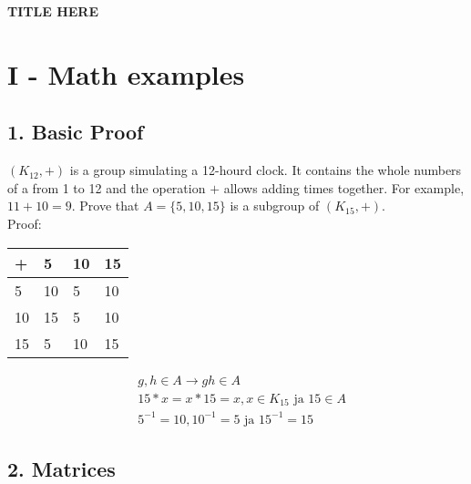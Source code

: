 \documentclass[12pt, oneside]{article}
\begin{document}
\pagestyle{fancy}
\rhead{ \thepage}


\begin{center}
\textbf{\Large TITLE HERE}
\end{center}

\section*{I - Math examples}

\subsection*{1. Basic Proof} 

$(K_{12}, +)$ is a group simulating a 12-hourd clock. It contains the whole numbers of a from 1 to 12 and the operation $+$ allows adding times together. For example, $11+10 = 9$. Prove that $A = \{5, 10, 15\}$ is a subgroup of $(K_{15}, +)$. \\

Proof: 

\begin{center}
\begin{tabular}{ l | l l l }
 +   & 5   & 10 & 15 \\ \hline
 5   & 10 & 5   & 10 \\
 10 & 15 & 5   & 10 \\
 15 & 5   & 10 & 15 
\end{tabular}
\end{center}

\begin{center}
\begin{align*}
&g,h \in A \rightarrow gh \in A	\tag{Closure} \\
&15 * x = x * 15 = x, x \in K_{15} \text{ ja } 15 \in A \tag{Identity element of K in A} \\
&5^{-1} = 10, 10^{-1} = 5 \text{ ja } 15^{-1} = 15 \tag{Each element's $(\in A)$ inverse $\in A$}
\end{align*}
\end{center}

\subsection*{2. Matrices} 
\end{document}
